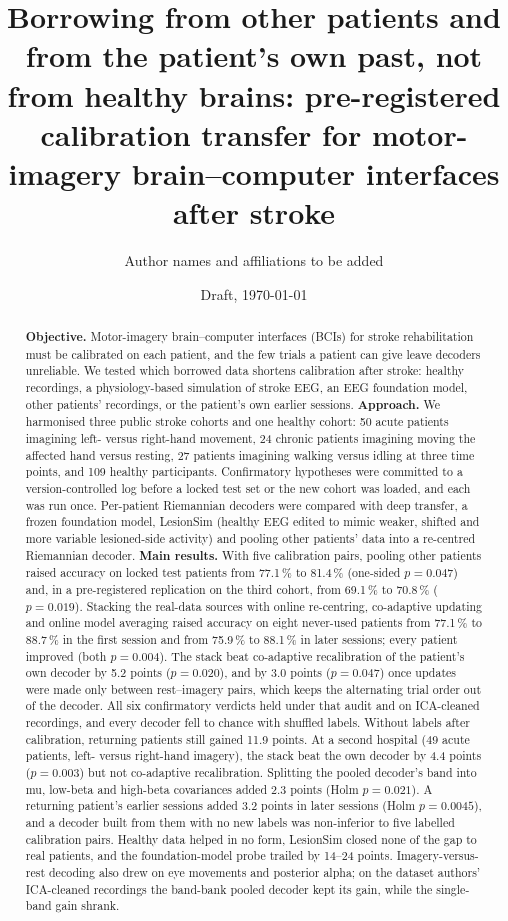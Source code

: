 \documentclass[11pt]{article}
\title{Borrowing from other patients and from the patient's own past, not from healthy brains: pre-registered calibration transfer for motor-imagery brain--computer interfaces after stroke}
\author{Author names and affiliations to be added}
\date{Draft, \today}
\newcommand{\pct}{\,\%}
\begin{document}
\maketitle

\begin{abstract}
\noindent\textbf{Objective.} Motor-imagery brain--computer interfaces (BCIs) for stroke rehabilitation must be calibrated on each patient, and the few trials a patient can give leave decoders unreliable. We tested which borrowed data shortens calibration after stroke: healthy recordings, a physiology-based simulation of stroke EEG, an EEG foundation model, other patients' recordings, or the patient's own earlier sessions.
\textbf{Approach.} We harmonised three public stroke cohorts and one healthy cohort: 50 acute patients imagining left- versus right-hand movement, 24 chronic patients imagining moving the affected hand versus resting, 27 patients imagining walking versus idling at three time points, and 109 healthy participants. Confirmatory hypotheses were committed to a version-controlled log before a locked test set or the new cohort was loaded, and each was run once. Per-patient Riemannian decoders were compared with deep transfer, a frozen foundation model, LesionSim (healthy EEG edited to mimic weaker, shifted and more variable lesioned-side activity) and pooling other patients' data into a re-centred Riemannian decoder.
\textbf{Main results.} With five calibration pairs, pooling other patients raised accuracy on locked test patients from 77.1\pct{} to 81.4\pct{} (one-sided $p = 0.047$) and, in a pre-registered replication on the third cohort, from 69.1\pct{} to 70.8\pct{} ($p = 0.019$). Stacking the real-data sources with online re-centring, co-adaptive updating and online model averaging raised accuracy on eight never-used patients from 77.1\pct{} to 88.7\pct{} in the first session and from 75.9\pct{} to 88.1\pct{} in later sessions; every patient improved (both $p = 0.004$). The stack beat co-adaptive recalibration of the patient's own decoder by 5.2 points ($p = 0.020$), and by 3.0 points ($p = 0.047$) once updates were made only between rest--imagery pairs, which keeps the alternating trial order out of the decoder. All six confirmatory verdicts held under that audit and on ICA-cleaned recordings, and every decoder fell to chance with shuffled labels. Without labels after calibration, returning patients still gained 11.9 points. At a second hospital (49 acute patients, left- versus right-hand imagery), the stack beat the own decoder by 4.4 points ($p = 0.003$) but not co-adaptive recalibration. Splitting the pooled decoder's band into mu, low-beta and high-beta covariances added 2.3 points (Holm $p = 0.021$). A returning patient's earlier sessions added 3.2 points in later sessions (Holm $p = 0.0045$), and a decoder built from them with no new labels was non-inferior to five labelled calibration pairs. Healthy data helped in no form, LesionSim closed none of the gap to real patients, and the foundation-model probe trailed by 14--24 points. Imagery-versus-rest decoding also drew on eye movements and posterior alpha; on the dataset authors' ICA-cleaned recordings the band-bank pooled decoder kept its gain, while the single-band gain shrank.

\end{abstract}
\end{document}
